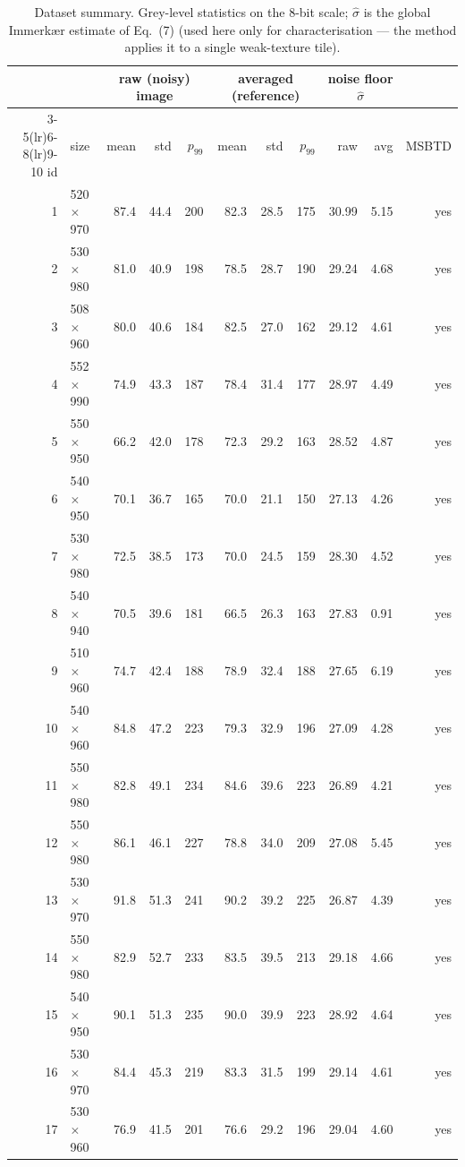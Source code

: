 \documentclass[11pt,a4paper]{article}
\newcommand{\sh}{\hat{\sigma}}
\begin{document}
\begin{table}[H]
\centering
\caption{Dataset summary. Grey-level statistics on the 8-bit scale; $\sh$ is the global Immerkær estimate of
Eq.~(7) (used here only for characterisation --- the method applies it to a single weak-texture tile).}
\label{tab:dataset}
\footnotesize
\setlength{\tabcolsep}{4.2pt}
\begin{tabular}{@{}rlrrrrrrrrr@{}}
\toprule
 & & \multicolumn{3}{c}{raw (noisy) image} & \multicolumn{3}{c}{averaged (reference)} & \multicolumn{2}{c}{noise floor $\sh$} &\\
\cmidrule(lr){3-5}\cmidrule(lr){6-8}\cmidrule(lr){9-10}
id & size & mean & std & $p_{99}$ & mean & std & $p_{99}$ & raw & avg & MSBTD\\
\midrule
 1 & 520$\times$970 &  87.4 &  44.4 &   200 &  82.3 &  28.5 &   175 & 30.99 &  5.15 & yes \\
 2 & 530$\times$980 &  81.0 &  40.9 &   198 &  78.5 &  28.7 &   190 & 29.24 &  4.68 & yes \\
 3 & 508$\times$960 &  80.0 &  40.6 &   184 &  82.5 &  27.0 &   162 & 29.12 &  4.61 & yes \\
 4 & 552$\times$990 &  74.9 &  43.3 &   187 &  78.4 &  31.4 &   177 & 28.97 &  4.49 & yes \\
 5 & 550$\times$950 &  66.2 &  42.0 &   178 &  72.3 &  29.2 &   163 & 28.52 &  4.87 & yes \\
 6 & 540$\times$950 &  70.1 &  36.7 &   165 &  70.0 &  21.1 &   150 & 27.13 &  4.26 & yes \\
 7 & 530$\times$980 &  72.5 &  38.5 &   173 &  70.0 &  24.5 &   159 & 28.30 &  4.52 & yes \\
 8 & 540$\times$940 &  70.5 &  39.6 &   181 &  66.5 &  26.3 &   163 & 27.83 &  0.91 & yes \\
 9 & 510$\times$960 &  74.7 &  42.4 &   188 &  78.9 &  32.4 &   188 & 27.65 &  6.19 & yes \\
10 & 540$\times$960 &  84.8 &  47.2 &   223 &  79.3 &  32.9 &   196 & 27.09 &  4.28 & yes \\
11 & 550$\times$980 &  82.8 &  49.1 &   234 &  84.6 &  39.6 &   223 & 26.89 &  4.21 & yes \\
12 & 550$\times$980 &  86.1 &  46.1 &   227 &  78.8 &  34.0 &   209 & 27.08 &  5.45 & yes \\
13 & 530$\times$970 &  91.8 &  51.3 &   241 &  90.2 &  39.2 &   225 & 26.87 &  4.39 & yes \\
14 & 550$\times$980 &  82.9 &  52.7 &   233 &  83.5 &  39.5 &   213 & 29.18 &  4.66 & yes \\
15 & 540$\times$950 &  90.1 &  51.3 &   235 &  90.0 &  39.9 &   223 & 28.92 &  4.64 & yes \\
16 & 530$\times$970 &  84.4 &  45.3 &   219 &  83.3 &  31.5 &   199 & 29.14 &  4.61 & yes \\
17 & 530$\times$960 &  76.9 &  41.5 &   201 &  76.6 &  29.2 &   196 & 29.04 &  4.60 & yes \\
\bottomrule
\end{tabular}
\end{table}
\end{document}
